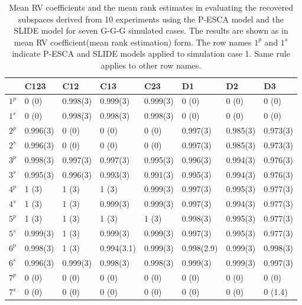 \begin{table}[h]
\small
\centering
\caption{Mean RV coefficients and the mean rank estimates in evaluating the recovered subspaces derived from 10 experiments using the P-ESCA model and the SLIDE model for seven G-G-G simulated cases. The results are shown as in mean RV coefficient(mean rank estimation) form. The row names $1^p$ and $1^s$ indicate P-ESCA and SLIDE models applied to simulation case 1. Same rule applies to other row names.}
\label{chapter5_tab:2}
\begin{tabular}{llllllll}
  \toprule
    & C123 & C12 & C13 & C23 & D1 & D2 & D3 \\
  \midrule
  $1^{p}$ & 0        (0)  & 0.998(3)   & 0.999(3)   & 0.999(3)   & 0        (0)  & 0        (0) & 0        (0)           \\
  $1^{s}$ & 0        (0)  & 0.998(3)   & 0.998(3)   & 0.998(3)   & 0        (0)  & 0        (0) & 0        (0)           \\
 \hline
 $2^{p}$  & 0.996(3)   & 0        (0)  & 0        (0)  & 0        (0)  & 0.997(3)   & 0.985(3)   & 0.973(3)   \\
 $2^{s}$  & 0.996(3)   & 0        (0)  & 0        (0)  & 0        (0)  & 0.997(3)   & 0.985(3)   & 0.973(3)   \\
 \hline
 $3^{p}$  & 0.998(3)   & 0.997(3)   & 0.997(3)   & 0.995(3)   & 0.996(3)   & 0.994(3)   & 0.976(3)   \\
 $3^{s}$  & 0.995(3)   & 0.996(3)   & 0.993(3)   & 0.991(3)   & 0.995(3)   & 0.994(3)   & 0.976(3)   \\
 \hline
 $4^{p}$  & 1        (3)  & 1        (3)  & 1        (3)  & 0.999(3)   & 0.997(3)   & 0.995(3)   & 0.977(3)   \\
 $4^{s}$  & 1        (3)  & 1        (3)  & 0.999(3)   & 0.999(3)   & 0.997(3)   & 0.994(3)   & 0.977(3)   \\
 \hline
 $5^{p}$  & 1        (3)  & 1        (3)  & 1        (3)  & 1        (3)  & 0.998(3)   & 0.995(3)   & 0.977(3)   \\
 $5^{s}$  & 0.999(3)   & 1        (3)  & 0.999(3)   & 0.999(3)   & 0.997(3)   & 0.995(3)   & 0.977(3)   \\
 \hline
 $6^{p}$ & 0.998(3)   & 1        (3)  & 0.994(3.1) & 0.999(3)   & 0.998(2.9) & 0.999(3)   & 0.998(3)   \\
 $6^{s}$ & 0.996(3)   & 0.999(3)   & 0.998(3)   & 0.998(3)   & 0.999(3)   & 0.999(3)   & 0.997(3)   \\
 \hline
 $7^{p}$  & 0        (0) & 0        (0)  & 0        (0)  & 0        (0)  & 0        (0)  & 0        (0)  & 0        (0)       \\
 $7^{s}$  & 0        (0) & 0        (0)  & 0        (0)  & 0        (0)  & 0        (0)  & 0        (0)  & 0        (1.4) \\
  \bottomrule
\end{tabular}
\end{table}

